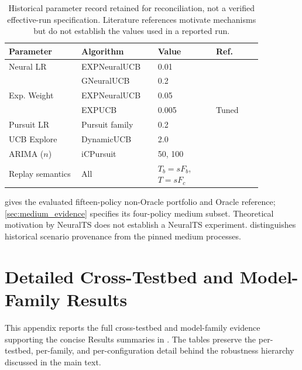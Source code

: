 \begin{table}[H]
\footnotesize
\centering
\setlength{\tabcolsep}{4pt}
\caption{Historical parameter record retained for reconciliation, not a verified effective-run specification. Literature references motivate mechanisms but do not establish the values used in a reported run.}
\label{tab:setup-hyperparameters}
\begin{tabular}{p{0.25\linewidth} p{0.25\linewidth} p{0.20\linewidth} p{0.16\linewidth}}
\toprule
\textbf{Parameter} & \textbf{Algorithm} & \textbf{Value} & \textbf{Ref.} \\
\midrule
Neural LR & EXPNeuralUCB & 0.01 & \cite{huang2024quantum} \\
          & GNeuralUCB   & 0.2  & \cite{zhou2020neuralucb} \\
\addlinespace[2pt]
Exp. Weight & EXPNeuralUCB & 0.05  & \cite{huang2024quantum} \\
            & EXPUCB       & 0.005 & Tuned \\
\addlinespace[2pt]
Pursuit LR & Pursuit family & 0.2 & \cite{thathachar2011networks} \\
\addlinespace[2pt]
UCB Explore & DynamicUCB & 2.0 & \cite{auer2002finite} \\
\addlinespace[2pt]
ARIMA ($n$) & iCPursuit & 50, 100 & \cite{box2015time} \\
\addlinespace[2pt]
Replay semantics & All & $T_b=sF_b$, $T=sF_c$ & \cite{schaul2015prioritized,mnih2015human} \\
\bottomrule
\end{tabular}
\end{table}


 gives the evaluated fifteen-policy non-Oracle portfolio and Oracle reference; \cref{sec:medium_evidence} specifies its four-policy medium subset. Theoretical motivation by NeuralTS does not establish a NeuralTS experiment.  distinguishes historical scenario provenance from the pinned medium processes.


\section{Detailed Cross-Testbed and Model-Family Results}
\label{app:cross_testbed_full_tables}
This appendix reports the full cross-testbed and model-family evidence supporting the concise Results summaries in . The tables preserve the per-testbed, per-family, and per-configuration detail behind the robustness hierarchy discussed in the main text.

